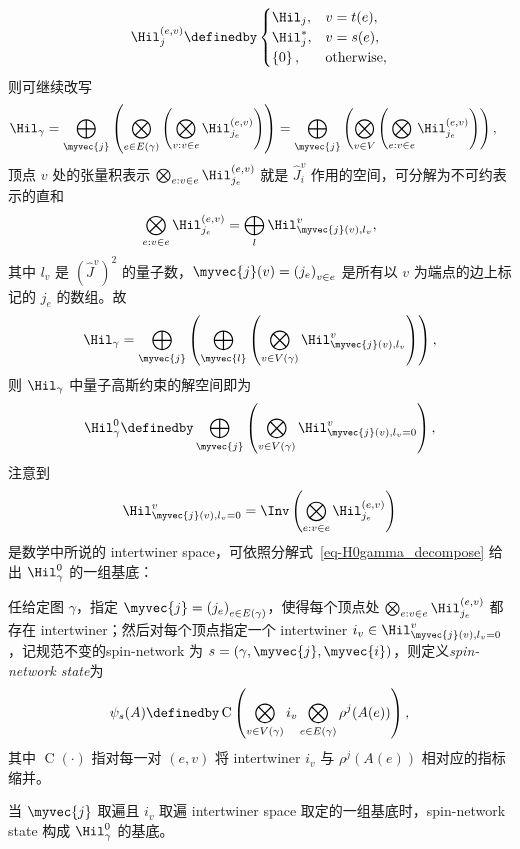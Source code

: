 			\begin{equation}
				\Hil_j^{(e,v)} \definedby
				\begin{cases}
					\Hil_j, & v=t(e),\\
					\Hil_j^*, & v=s(e),\\
					\left\{ 0 \right\}, & \text{otherwise},
				\end{cases}
			\end{equation}
			则可继续改写
			\begin{equation}
				\begin{split}
					\Hil_\gamma &= \bigoplus_{\myvec{j}} \left( \bigotimes_{e\in E(\gamma)} \left( \bigotimes_{\substack{v:v\in e}} \Hil_{j_e}^{(e,v)} \right) \right) = \bigoplus_{\myvec{j}} \left( \bigotimes_{v\in V} \left( \bigotimes_{\substack{e:v\in e}} \Hil_{j_e}^{(e,v)} \right) \right),
				\end{split}
			\end{equation}
			顶点 $v$ 处的张量积表示 $\bigotimes_{\substack{e:v\in e}} \Hil_{j_e}^{(e,v)}$ 就是 $\hat{J}_i^{v}$ 作用的空间，可分解为不可约表示的直和
			\begin{equation}
				\bigotimes_{\substack{e:v\in e}} \Hil_{j_e}^{(e,v)} = \bigoplus_{l} \Hil_{\myvec{j}(v),l_v}^{v},
			\end{equation}
			其中 $l_v$ 是 $\left( \hat{J}^{v} \right)^2$ 的量子数，$\myvec{j}(v) = \left( j_e \right)_{v\in e}$ 是所有以 $v$ 为端点的边上标记的 $j_e$ 的数组。故
			\begin{equation}
				\Hil_\gamma = \bigoplus_{\myvec{j}} \left( \bigoplus_{\myvec{l}} \left( \bigotimes_{v\in V(\gamma)} \Hil_{\myvec{j}(v),l_v}^{v} \right) \right),
			\end{equation}
			则 $\Hil_\gamma$ 中量子高斯约束的解空间即为
			\begin{equation}
				\Hil_\gamma^0 \definedby \bigoplus_{\myvec{j}} \left( \bigotimes_{v\in V(\gamma)} \Hil_{\myvec{j}(v),l_v=0}^{v} \right),\label{eq-H0gamma_decompose}
			\end{equation}
			注意到
			\begin{equation}
				\Hil_{\myvec{j}(v),l_v=0}^{v} = \Inv\left( \bigotimes_{\substack{e:v\in e}} \Hil_{j_e}^{(e,v)} \right)
			\end{equation}
			是数学中所说的 intertwiner space，可依照分解式~\eqref{eq-H0gamma_decompose} 给出 $\Hil_\gamma^0$ 的一组基底：
			\begin{Definition}
				任给定图 $\gamma$，指定 $\myvec{j} = \left( j_e \right)_{e\in E(\gamma)}$，使得每个顶点处 $\bigotimes_{\substack{e:v\in e}} \Hil_{j_e}^{(e,v)}$ 都存在 intertwiner；然后对每个顶点指定一个 intertwiner $i_v \in \Hil_{\myvec{j}(v),l_v=0}^{v}$，记规范不变的spin-network 为 $s=(\gamma,\myvec{j},\myvec{i})$，则定义\emph{spin-network state}为
				\begin{equation}
					\psi_s(A) \definedby \operatorname{C} \left( \bigotimes_{v\in V(\gamma)} i_v \bigotimes_{e\in E(\gamma)} \rho^j(A(e)) \right),
				\end{equation}
				其中 $\operatorname{C}(\cdot)$ 指对每一对 $(e,v)$ 将 intertwiner $i_v$ 与 $\rho^j(A(e))$ 相对应的指标缩并。
		
				当 $\myvec{j}$ 取遍且 $i_v$ 取遍 intertwiner space 取定的一组基底时，spin-network state 构成 $\Hil_\gamma^0$ 的基底。
			\end{Definition}
